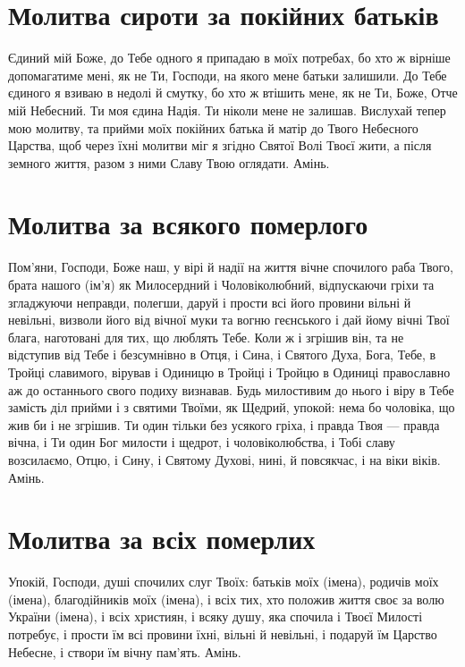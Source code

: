 \documentclass[chapters.tex]{subfiles}
\begin{document}
\section{Молитва сироти за покійних батьків}
Єдиний мій Боже, до Тебе одного я припадаю в моїх потребах, бо хто ж вірніше допомагатиме мені, як не Ти, Господи, на якого мене батьки залишили. До Тебе єдиного я взиваю в недолі й смутку, бо хто ж втішить мене, як не Ти, Боже, Отче мій Небесний. Ти моя єдина Надія. Ти ніколи мене не залишав. Вислухай тепер мою молитву, та прийми моїх покійних батька й матір до Твого Небесного Царства, щоб через їхні молитви міг я згідно Святої Волі Твоєї жити, а після земного життя, разом з ними Славу Твою оглядати. Амінь.

\section{Молитва за всякого померлого}
Пом’яни, Господи, Боже наш, у вірі й надії на життя вічне спочилого раба Твого, брата нашого (ім’я) як Милосердний і Чоловіколюбний, відпускаючи гріхи та згладжуючи неправди, полегши, даруй і прости всі його провини вільні й невільні, визволи його від вічної муки та вогню геєнського і дай йому вічні Твої блага, наготовані для тих, що люблять Тебе. Коли ж і згрішив він, та не відступив від Тебе і безсумнівно в Отця, і Сина, і Святого Духа, Бога, Тебе, в Тройці славимого, вірував і Одиницю в Тройці і Тройцю в Одиниці православно аж до останнього свого подиху визнавав. Будь милостивим до нього і віру в Тебе замість діл прийми і з святими Твоїми, як Щедрий, упокой: нема бо чоловіка, що жив би і не згрішив. Ти один тільки без усякого гріха, і правда Твоя — правда вічна, і Ти один Бог милости і щедрот, і чоловіколюбства, і Тобі славу возсилаємо, Отцю, і Сину, і Святому Духові, нині, й повсякчас, і на віки віків. Амінь.

\section{Молитва за всіх померлих}
Упокій, Господи, душі спочилих слуг Твоїх: батьків моїх (імена), родичів моїх (імена), благодійників моїх (імена), і всіх тих, хто положив життя своє за волю України (імена), і всіх християн, і всяку душу, яка спочила і Твоєї Милості потребує, і прости їм всі провини їхні, вільні й невільні, і подаруй їм Царство Небесне, і створи їм вічну пам’ять. Амінь.
\end{document}
